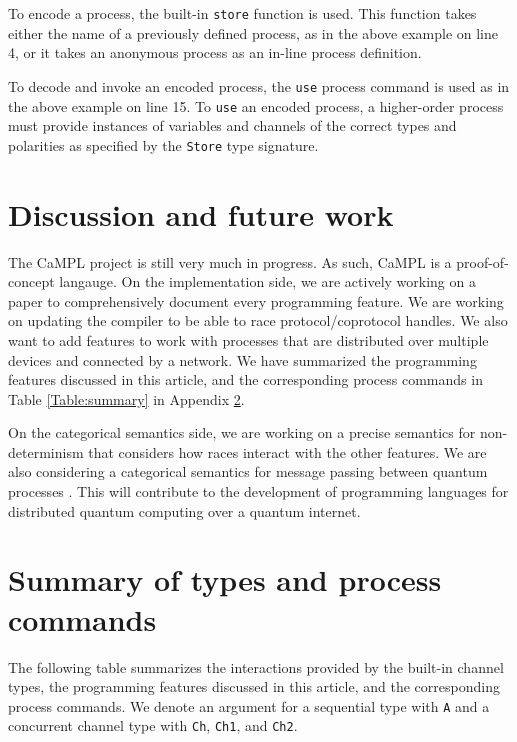 \documentclass[11pt]{article}
\begin{document}
To encode a process, the built-in \lstinline$store$ function is used.
This function takes either the name of a previously defined process, as in the above example on line 4, or it takes an anonymous process as an in-line process definition.

To decode and invoke an encoded process, the \lstinline$use$ process command is used as in the above example on line 15.
To \lstinline$use$ an encoded process, a higher-order process must provide instances of variables and channels of the correct types and polarities as specified by the \lstinline$Store$ type signature.

\section{Discussion and future work}

The CaMPL project is still very much in progress.
As such, CaMPL is a proof-of-concept langauge.
On the implementation side, we are actively working on a paper to comprehensively document every programming feature.
We are working on updating the compiler to be able to race protocol/coprotocol handles.
We also want to add features to work with processes that are distributed over multiple devices and connected by a network. We have summarized the programming features discussed in this article, and the corresponding process commands in Table \ref{Table:summary} in Appendix \ref{sec:summarytable}.

On the categorical semantics side, we are working on a precise semantics for non-determinism that considers how races interact with the other features.
We are also considering a categorical semantics for message passing between quantum processes \cite{QMP23}.
This will contribute to the development of programming languages for distributed quantum computing over a quantum internet.

\printbibliography

\newpage 
\appendix


\section{Summary of types and process commands}
\label{sec:summarytable}

The following table summarizes the interactions provided by the built-in channel types, the programming features discussed in this article, and the corresponding process commands.
We denote an argument for a sequential type with \lstinline$A$ and a concurrent channel type with \lstinline$Ch$, \lstinline$Ch1$, and \lstinline$Ch2$.
\end{document}
